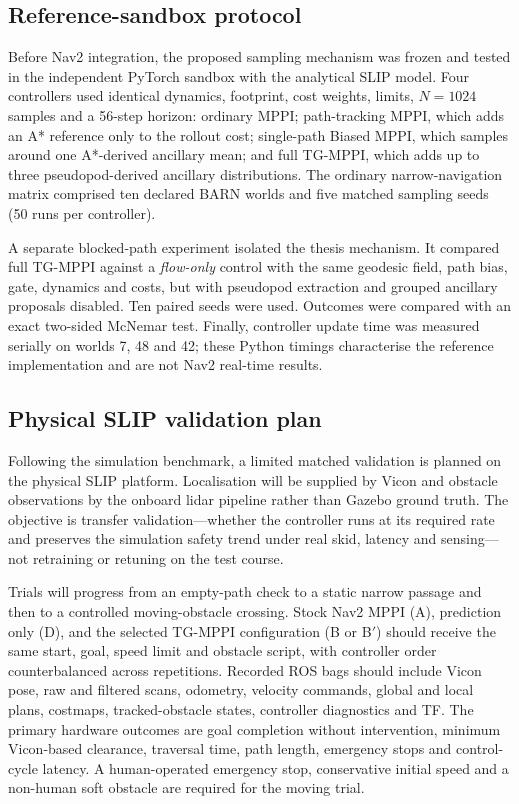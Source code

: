 \documentclass[journal]{IEEEtran}
\begin{document}
\subsection{Reference-sandbox protocol}
Before Nav2 integration, the proposed sampling mechanism was frozen and tested
in the independent PyTorch sandbox with the analytical SLIP model. Four
controllers used identical dynamics, footprint, cost weights, limits,
$N=1024$ samples and a 56-step horizon: ordinary MPPI; path-tracking MPPI,
which adds an A* reference only to the rollout cost; single-path Biased MPPI,
which samples around one A*-derived ancillary mean; and full TG-MPPI, which
adds up to three pseudopod-derived ancillary distributions. The ordinary
narrow-navigation matrix comprised ten declared BARN worlds and five matched
sampling seeds (50 runs per controller).

A separate blocked-path experiment isolated the thesis mechanism. It compared
full TG-MPPI against a \emph{flow-only} control with the same geodesic
field, path bias, gate, dynamics and costs, but with pseudopod extraction and
grouped ancillary proposals disabled. Ten paired seeds were used. Outcomes
were compared with an exact two-sided McNemar test. Finally, controller update
time was measured serially on worlds 7, 48 and 42; these Python timings
characterise the reference implementation and are not Nav2 real-time results.

\subsection{Physical SLIP validation plan}
Following the simulation benchmark, a limited matched validation is planned on
the physical SLIP platform. Localisation will be supplied by Vicon and obstacle
observations by the onboard lidar pipeline rather than Gazebo ground truth.
The objective is transfer validation---whether the controller runs at its
required rate and preserves the simulation safety trend under real skid,
latency and sensing---not retraining or retuning on the test course.

Trials will progress from an empty-path check to a static narrow passage and
then to a controlled moving-obstacle crossing. Stock Nav2 MPPI (A), prediction
only (D), and the selected TG-MPPI configuration (B or B$'$) should receive the
same start, goal, speed limit and obstacle script, with controller order
counterbalanced across repetitions. Recorded ROS bags should include Vicon
pose, raw and filtered scans, odometry, velocity commands, global and local
plans, costmaps, tracked-obstacle states, controller diagnostics and TF. The
primary hardware outcomes are goal completion without intervention, minimum
Vicon-based clearance, traversal time, path length, emergency stops and
control-cycle latency. A human-operated emergency stop, conservative initial
speed and a non-human soft obstacle are required for the moving trial.
\end{document}
